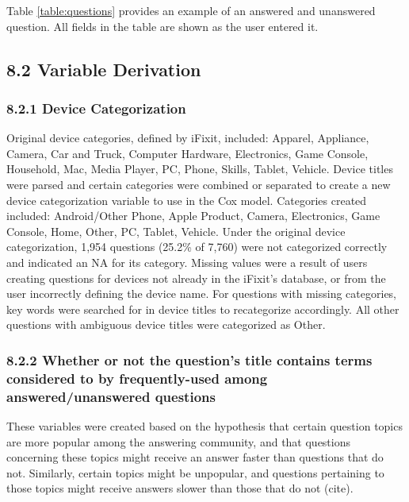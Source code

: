 \documentclass{article}
\begin{document}
Table \ref{table:questions} provides an example of an answered and unanswered question. All fields in the table are shown as the user entered it. 


\subsection*{8.2 Variable Derivation}

\subsubsection*{8.2.1 Device Categorization}

Original device categories, defined by iFixit, included: Apparel, Appliance, Camera, Car and Truck, Computer Hardware, Electronics, Game Console, Household, Mac, Media Player, PC, Phone, Skills, Tablet, Vehicle. Device titles were parsed and certain categories were combined or separated to create a new device categorization variable to use in the Cox model. Categories created included: Android/Other Phone, Apple Product, Camera, Electronics, Game Console, Home, Other, PC, Tablet, Vehicle. Under the original device categorization, 1,954 questions (25.2\% of 7,760) were not categorized correctly and indicated an NA for its category. Missing values were a result of users creating questions for devices not already in the iFixit's database, or from the user incorrectly defining the device name. For questions with missing categories, key words were searched for in device titles to recategorize accordingly. All other questions with ambiguous device titles were categorized as Other. 

\subsubsection*{8.2.2 Whether or not the question's title contains terms considered to by frequently-used among answered/unanswered questions}

These variables were created based on the hypothesis that certain question topics are more popular among the answering community, and that questions concerning these topics might receive an answer faster than questions that do not. Similarly, certain topics might be unpopular, and questions pertaining to those topics might receive answers slower than those that do not (cite).
\end{document}
